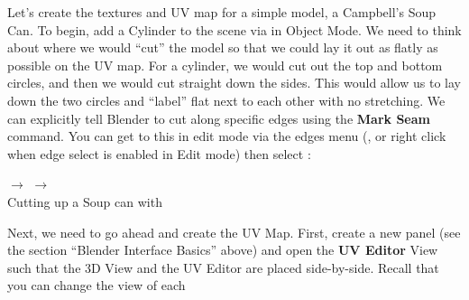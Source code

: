 \documentclass[11pt]{article}
\begin{document}
Let's create the textures and UV map for a simple model, a Campbell's Soup Can.  To begin, add a
Cylinder to the scene via  in Object Mode.  We need to think about where we
would ``cut'' the model so that we could lay it out as flatly as possible on the UV map.  For a
cylinder, we would cut out the top and bottom circles, and then we would cut straight down the sides.
This would allow us to lay down the two circles and ``label'' flat next to each other with no 
stretching.  We can explicitly tell Blender to cut along specific edges using the \textbf{Mark Seam}
command.  You can get to this in edit mode via the edges menu (, or right click when 
edge select is enabled in Edit mode) then select 
:
\begin{center}
     $\rightarrow$
     $\rightarrow$
     \\
    Cutting up a Soup can with 
\end{center}
Next, we need to go ahead and create the UV Map.  First, create a new panel (see the section 
``Blender Interface Basics'' above) and open the \textbf{UV Editor} View such that the 3D
View and the UV Editor are placed side-by-side.  Recall that you can change the view of each
\end{document}
